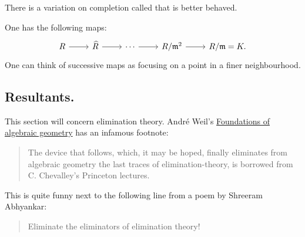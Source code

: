 \documentclass [11 pt, oneside] {article}
\begin{document}
\begin{remark}
	There is a variation on completion called  that is better behaved.
\end{remark}

One has the following maps:
\[
\begin{tikzcd}
	R\ar[r]&\widehat{R}\ar[r] &\cdots\ar[r] & R/\mathfrak{m}^2 \ar[r]& R/\mathfrak{m} = K.
\end{tikzcd}
\]
One can think of successive maps as focusing on a point in a finer neighbourhood.


\subsection{Resultants.}
This section will concern elimination theory. Andr\'e Weil's \ul{Foundations of algebraic geometry} has an infamous footnote:
\begin{quote}
	\small 
	The device that follows, which, it may be hoped, finally eliminates from algebraic geometry the last traces of elimination-theory, is borrowed from C. Chevalley's Princeton lectures.
\end{quote}
This is quite funny next to the following line from a poem by Shreeram Abhyankar:
\begin{quote}
	\small 
	Eliminate the eliminators of elimination theory!
\end{quote}
\end{document}
